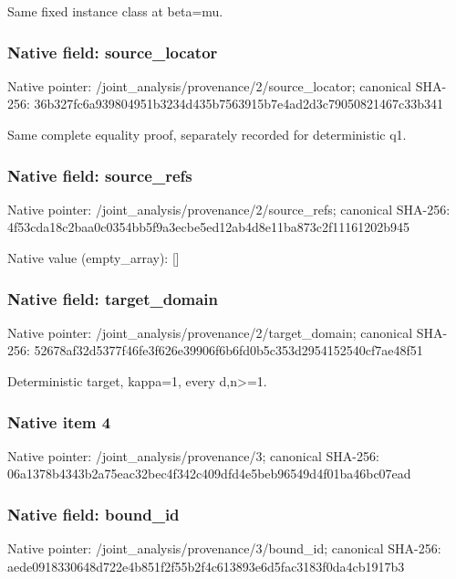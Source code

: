 \documentclass[10pt,a4paper]{article}
\begin{document}
\begingroup\raggedright\sloppy Same fixed instance class at beta=\allowbreak{}mu.\par\endgroup

\subsubsection{Native field: source\_\allowbreak{}locator}
Native pointer: /joint\_\allowbreak{}analysis/provenance/2/source\_\allowbreak{}locator; canonical SHA-256: 36b327fc6a939804951b3234d435b7563915b7e4ad2d3c79050821467c33b341

\begingroup\raggedright\sloppy Same complete equality proof,\allowbreak{} separately recorded for deterministic q1.\par\endgroup

\subsubsection{Native field: source\_\allowbreak{}refs}
Native pointer: /joint\_\allowbreak{}analysis/provenance/2/source\_\allowbreak{}refs; canonical SHA-256: 4f53cda18c2baa0c0354bb5f9a3ecbe5ed12ab4d8e11ba873c2f11161202b945

Native value (empty\_\allowbreak{}array): []

\subsubsection{Native field: target\_\allowbreak{}domain}
Native pointer: /joint\_\allowbreak{}analysis/provenance/2/target\_\allowbreak{}domain; canonical SHA-256: 52678af32d5377f46fe3f626e39906f6b6fd0b5c353d2954152540cf7ae48f51

\begingroup\raggedright\sloppy Deterministic target,\allowbreak{} kappa=\allowbreak{}1,\allowbreak{} every d,\allowbreak{}n>=\allowbreak{}1.\par\endgroup

\subsubsection{Native item 4}
Native pointer: /joint\_\allowbreak{}analysis/provenance/3; canonical SHA-256: 06a1378b4343b2a75eac32bec4f342c409dfd4e5beb96549d4f01ba46bc07ead

\subsubsection{Native field: bound\_\allowbreak{}id}
Native pointer: /joint\_\allowbreak{}analysis/provenance/3/bound\_\allowbreak{}id; canonical SHA-256: aede0918330648d722e4b851f2f55b2f4c613893e6d5fac3183f0da4cb1917b3
\end{document}
